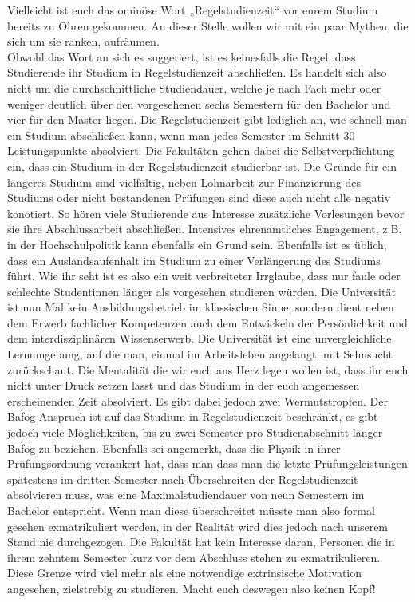 Vielleicht ist euch das ominöse Wort „Regelstudienzeit“ vor eurem Studium bereits zu Ohren gekommen. An dieser Stelle wollen wir mit ein paar Mythen, die sich um sie ranken, aufräumen.\\
Obwohl das Wort an sich es suggeriert, ist es keinesfalls die Regel, dass Studierende ihr Studium in Regelstudienzeit abschließen. Es handelt sich also nicht um die durchschnittliche Studiendauer, welche je nach Fach mehr oder weniger deutlich über den vorgesehenen sechs Semestern für den Bachelor und vier für den Master liegen. Die Regelstudienzeit gibt lediglich an, wie schnell man ein Studium abschließen kann, wenn man jedes Semester im Schnitt 30 Leistungspunkte absolviert. Die Fakultäten gehen dabei die Selbstverpflichtung ein, dass ein Studium in der Regelstudienzeit studierbar ist.
Die Gründe für ein längeres Studium sind vielfältig, neben Lohnarbeit zur Finanzierung des Studiums oder nicht bestandenen Prüfungen sind diese auch nicht alle negativ konotiert. So hören viele Studierende aus Interesse zusätzliche Vorlesungen bevor sie ihre Abschlussarbeit abschließen. Intensives ehrenamtliches Engagement, z.B. in der Hochschulpolitik kann ebenfalls ein Grund sein. Ebenfalls ist es üblich, dass ein Auslandsaufenhalt im Studium zu einer Verlängerung des Studiums führt. 
Wie ihr seht ist es also ein weit verbreiteter Irrglaube, dass nur faule oder schlechte Studentinnen länger als vorgesehen studieren würden. Die Universität ist nun Mal kein Ausbildungsbetrieb im klassischen Sinne, sondern dient neben dem Erwerb fachlicher Kompetenzen auch dem Entwickeln der Persönlichkeit und dem interdisziplinären Wissenserwerb. Die Universität ist eine unvergleichliche Lernumgebung, auf die man, einmal im Arbeitsleben angelangt, mit Sehnsucht zurückschaut. Die Mentalität die wir euch ans Herz legen wollen ist, dass ihr euch nicht unter Druck setzen lasst und das Studium in der euch angemessen erscheinenden Zeit absolviert.
Es gibt dabei jedoch zwei Wermutstropfen. Der Bafög-Anspruch ist auf das Studium in Regelstudienzeit beschränkt, es gibt jedoch viele Möglichkeiten, bis zu zwei Semester pro Studienabschnitt länger Bafög zu beziehen. Ebenfalls sei angemerkt, dass die Physik in ihrer Prüfungsordnung verankert hat, dass man dass man die letzte Prüfungsleistungen spätestens im dritten Semester nach Überschreiten der Regelstudienzeit absolvieren muss, was eine Maximalstudiendauer von neun Semestern im Bachelor entspricht. Wenn man diese überschreitet müsste man also formal gesehen exmatrikuliert werden, in der Realität wird dies jedoch nach unserem Stand nie durchgezogen. Die Fakultät hat kein Interesse daran, Personen die in ihrem zehntem Semester kurz vor dem Abschluss stehen zu exmatrikulieren. Diese Grenze wird viel mehr als eine notwendige extrinsische Motivation angesehen, zielstrebig zu studieren. Macht euch deswegen also keinen Kopf!

